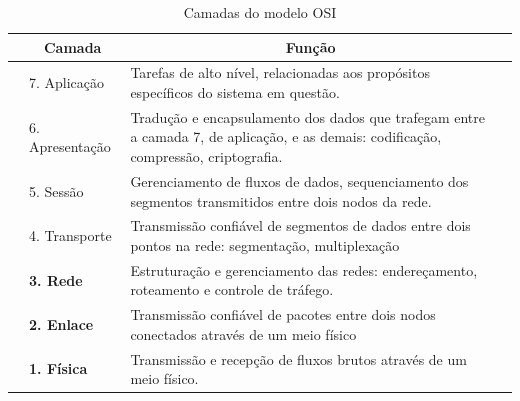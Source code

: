 \documentclass[
	12pt,				%
	openright,			%
	oneside,
	a4paper,			%
	english,			%
	french,				%
	spanish,			%
	brazil				%
	]{abntex2}
\begin{document}
\begin{table}[b!]
	\centering
	\caption{Camadas do modelo OSI}
	\label{tab_osi}
	\begin{tabular}{m{0.6cm}|m{3.0cm}|m{10.8cm}|@{}m{0pt}@{}}
		\cline{2-3}
		& \multicolumn{1}{c|}{\cellcolor[HTML]{EAEAC8}\textbf{Camada}} & \multicolumn{1}{|c|}{\cellcolor[HTML]{EAEAC8} \textbf{Função}} &\\[2.2ex] \hline
		\multicolumn{1}{|l|}{\multirow{9}{*}{\rotatebox[origin=c]{90}{Aplicação}}} & 7. Aplicação & Tarefas de alto nível, relacionadas aos propósitos específicos do sistema em questão. \\ \cline{2-3} 
		\multicolumn{1}{|l|}{} & 6. Apresentação & Tradução e encapsulamento dos dados que trafegam entre a camada 7, de aplicação, e as demais: codificação, compressão, criptografia. \\ \cline{2-3} 
		\multicolumn{1}{|l|}{} & 5. Sessão & Gerenciamento de fluxos de dados, sequenciamento dos segmentos transmitidos entre dois nodos da rede. \\ \cline{2-3} 
		\multicolumn{1}{|l|}{} & 4. Transporte & Transmissão confiável de segmentos de dados entre dois pontos na rede: segmentação, multiplexação \\ \hline
		\multicolumn{1}{|l|}{\multirow{6}{*}{\rotatebox[origin=c]{90}{Transporte}}} & \textbf{3. Rede} & Estruturação e gerenciamento das redes: endereçamento, roteamento e controle de tráfego. \\ \cline{2-3} 
		\multicolumn{1}{|l|}{} & \textbf{2. Enlace} & Transmissão confiável de pacotes entre dois nodos conectados através de um meio físico \\ \cline{2-3} 
		\multicolumn{1}{|c|}{} & \textbf{1. Física} & Transmissão e recepção de fluxos brutos através de um meio físico. \\ \hline
	\end{tabular}
\end{table}
\end{document}
